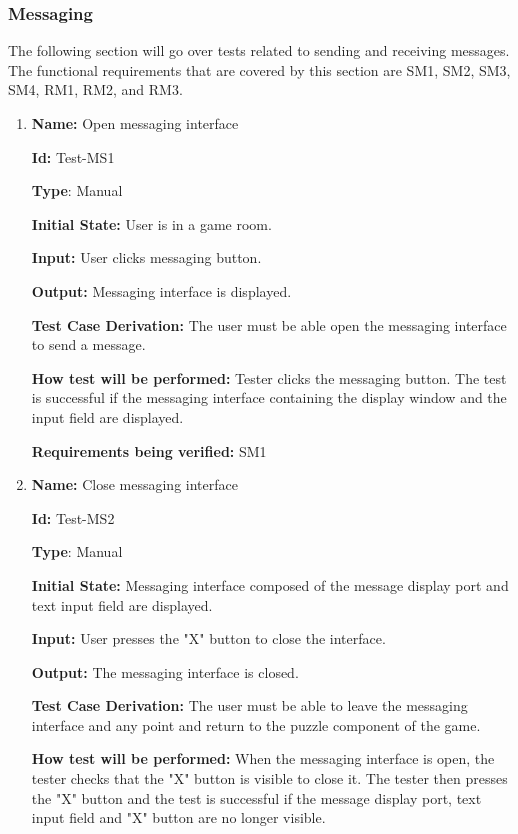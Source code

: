 \documentclass[12pt, titlepage]{article}
\begin{document}
\subsubsection{Messaging}
The following section will go over tests related to sending and receiving messages. The functional requirements that are covered by this section are SM1, SM2, SM3, SM4, RM1, RM2, and RM3.

\begin{enumerate}

\item{\textbf{Name:} Open messaging interface} \label{itm:Test-MS1}

\textbf{Id:} Test-MS1

\textbf{Type}: Manual

\textbf{Initial State:} User is in a game room.

\textbf{Input:} User clicks messaging button.

\textbf{Output:} Messaging interface is displayed.

\textbf{Test Case Derivation:}
The user must be able open the messaging interface to send a message.

\textbf{How test will be performed:}
Tester clicks the messaging button. The test is successful if the messaging interface containing the display window and the input field are displayed.

\textbf{Requirements being verified: } SM1

\item{\textbf{Name:} Close messaging interface} \label{itm:Test-MS2}

\textbf{Id:} Test-MS2

\textbf{Type}: Manual

\textbf{Initial State:} Messaging interface composed of the message display port and text input field are displayed.

\textbf{Input:} User presses the "X" button to close the interface.

\textbf{Output:} The messaging interface is closed.

\textbf{Test Case Derivation:}
The user must be able to leave the messaging interface and any point and return to the puzzle component of the game.

\textbf{How test will be performed:}
When the messaging interface is open, the tester checks that the "X" button is visible to close it. The tester then presses the "X" button and the test is successful if the message display port, text input field and "X" button are no longer visible.


\end{enumerate}
\end{document}
